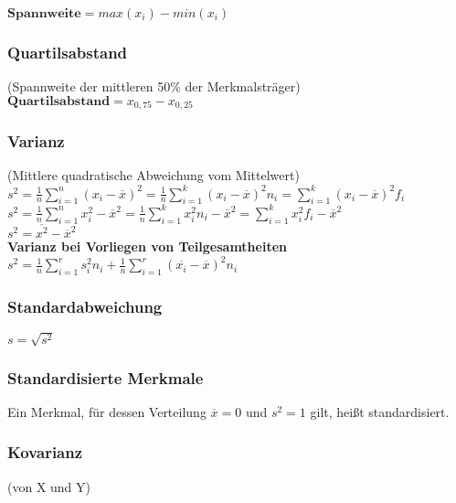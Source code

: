 \documentclass[10pt,a4paper]{article}
\begin{document}
$\textbf{Spannweite} = max(x_i) - min(x_i)$

\subsubsection{Quartilsabstand}
(Spannweite der mittleren 50\% der Merkmalsträger)\\

$\textbf{Quartilsabstand} = x_{0,75} - x_{0,25}$

\subsubsection{Varianz}
(Mittlere quadratische Abweichung vom Mittelwert)\\

$s^2 = \frac{1}{n}\sum\limits_{i=1}^n (x_i - \overline{x})^2 = \frac{1}{n}\sum\limits_{i=1}^k (x_i - \overline{x})^2 n_i = \sum\limits_{i=1}^k (x_i - \overline{x})^2 f_i$ \\

$s^2 = \frac{1}{n}\sum\limits_{i=1}^n x_i^2 - \overline{x}^2 = \frac{1}{n}\sum\limits_{i=1}^k x_i^2 n_i - \overline{x}^2 = \sum\limits_{i=1}^k x_i^2 f_i - \overline{x}^2$ \\

$s^2 = \overline{x^2} - \overline{x}^2$\\

\textbf{Varianz bei Vorliegen von Teilgesamtheiten}\\

$s^2 = \frac{1}{n}\sum\limits_{i=1}^r s_i^2n_i +  \frac{1}{n}\sum\limits_{i=1}^r (\overline{x_i} - \overline{x})^2 n_i $

\subsubsection{Standardabweichung}

$s = \sqrt{s^2}$

\subsubsection{Standardisierte Merkmale}

Ein Merkmal, für dessen Verteilung $\overline{x} = 0$ und $s^2 = 1$ gilt, heißt 
standardisiert.

\subsubsection{Kovarianz}
(von X und Y)\\
\end{document}
